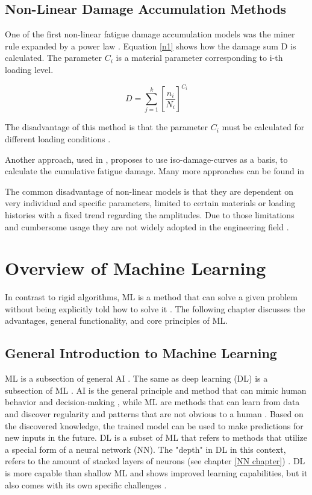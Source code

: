 \subsection{Non-Linear Damage Accumulation Methods}
One of the first non-linear fatigue damage accumulation models was the miner rule expanded by a power law \cite{Zuo}.
Equation \ref{n1} shows how the damage sum D is calculated. The parameter \(C_i\) is a material parameter corresponding to i-th loading level. 

\begin{equation}\label{n1}
	D = \sum_{j=1}^{k}\left [\frac{n_i}{N_i}\right ]^{{C_i}}
\end{equation}

The disadvantage of this method is that the parameter \(C_i\) must be calculated for different loading
conditions  \cite{Zuo}.

Another approach, used in \cite{Rege}, proposes to use iso-damage-curves as a basis, to calculate the cumulative fatigue damage.
Many more approaches can be found in \cite{Zhu1,Gao,Lv,Chen}

The common disadvantage of non-linear models is that they are dependent on very individual and specific parameters, limited to certain materials or loading histories with a fixed trend regarding the amplitudes. Due to those limitations and cumbersome usage they are not widely adopted in the engineering field \cite{Vietze}. 


\newpage
\section{Overview of Machine Learning}
In contrast to rigid algorithms, ML is a method that can solve a given problem without being explicitly told how to solve it \cite{Sutton,Janiesch}. The following chapter discusses the advantages, general functionality, and core principles of ML.

\subsection{General Introduction to Machine Learning}\label{General Introduction to Machine Learning}
ML is a subsection of general AI \cite{Helm}. The same as deep learning (DL) is a subsection of ML \cite{LeCun}.
AI is the general principle and method that can mimic human behavior and decision-making \cite{Janiesch}, while ML are methods that can learn from data and discover regularity and patterns that are not obvious to a human \cite{Theodoridis}. Based on the discovered knowledge, the trained model can be used to make predictions for new inputs in the future.
DL is a subset of ML that refers to methods that utilize a special form of a neural network (NN). The "depth" in DL in this context, refers to the amount of stacked layers of neurons (see chapter \ref{NN chapter}) \cite{Carleo}. 
DL is more capable than shallow ML and shows improved learning capabilities, but it also comes with its own specific challenges \cite{Janiesch, LeCun}.

